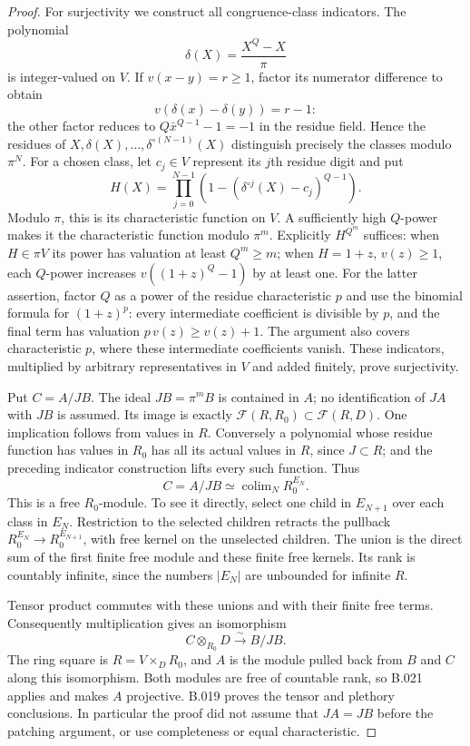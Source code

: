 \begin{proof}
For surjectivity we construct all congruence-class indicators.
The polynomial
\[
 \delta(X)=\frac{X^Q-X}{\pi}
\]
is integer-valued on $V$. If $v(x-y)=r\ge1$, factor its numerator
difference to obtain
\[
 v(\delta(x)-\delta(y))=r-1:
\]
the other factor reduces to $Q\bar x^{Q-1}-1=-1$ in the residue
field. Hence the residues of
$X,\delta(X),\ldots,\delta^{\circ(N-1)}(X)$ distinguish precisely
the classes modulo $\pi^N$. For a chosen class, let $c_j\in V$
represent its $j$th residue digit and put
\[
 H(X)=\prod_{j=0}^{N-1}
       \left(1-(\delta^{\circ j}(X)-c_j)^{Q-1}\right).
\]
Modulo $\pi$, this is its characteristic function on $V$.
A sufficiently high $Q$-power makes it the characteristic function
modulo $\pi^m$. Explicitly $H^{Q^m}$ suffices: when $H\in\pi V$
its power has valuation at least $Q^m\ge m$; when $H=1+z$,
$v(z)\ge1$, each $Q$-power increases $v((1+z)^Q-1)$ by at least
one. For the latter assertion, factor $Q$ as a power of the
residue characteristic $p$ and use the binomial formula for
$(1+z)^p$: every intermediate coefficient is divisible by $p$,
and the final term has valuation $p\,v(z)\ge v(z)+1$.
The argument also covers characteristic $p$, where these
intermediate coefficients vanish. These indicators, multiplied
by arbitrary representatives in $V$ and added finitely, prove
surjectivity.

Put $C=A/JB$. The ideal $JB=\pi^mB$ is contained in $A$; no
identification of $JA$ with $JB$ is assumed.
Its image is exactly $\mathcal F(R,R_0)\subset\mathcal F(R,D)$.
One implication follows from values in $R$. Conversely a
polynomial whose residue function has values in $R_0$ has all
its actual values in $R$, since $J\subset R$; and the preceding
indicator construction lifts every such function. Thus
\[
 C=A/JB\simeq\mathop{\mathrm{colim}}_N R_0^{E_N}.
\]
This is a free $R_0$-module. To see it directly, select one child
in $E_{N+1}$ over each class in $E_N$. Restriction to the selected
children retracts the pullback
$R_0^{E_N}\to R_0^{E_{N+1}}$, with free kernel on the unselected
children. The union is the direct sum of the first finite free
module and these finite free kernels. Its rank is countably
infinite, since the numbers $|E_N|$ are unbounded for infinite $R$.

Tensor product commutes with these unions and with their finite
free terms. Consequently multiplication gives an isomorphism
\[
 C\otimes_{R_0}D\xrightarrow{\sim}B/JB.
\]
The ring square is $R=V\times_D R_0$, and $A$ is the module
pulled back from $B$ and $C$ along this isomorphism. Both modules
are free of countable rank, so B.021 applies and makes $A$
projective. B.019 proves the tensor and plethory conclusions.
In particular the proof did not assume that $JA=JB$ before the
patching argument, or use completeness or equal characteristic.
\end{proof}

